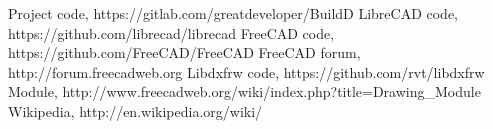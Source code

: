 \begin{thebibliography}{9}
\bibitem{} Project code, https://gitlab.com/greatdeveloper/BuildD
\bibitem{} LibreCAD code, https://github.com/librecad/librecad
\bibitem{} FreeCAD code, https://github.com/FreeCAD/FreeCAD
\bibitem{} FreeCAD forum, http://forum.freecadweb.org
\bibitem{} Libdxfrw code, https://github.com/rvt/libdxfrw
\bibitem{} Module, http://www.freecadweb.org/wiki/index.php?title=Drawing\_Module
\bibitem{} Wikipedia, http://en.wikipedia.org/wiki/
\end{thebibliography}
